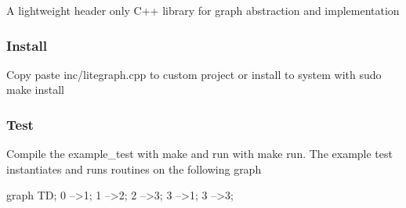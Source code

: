 A lightweight header only C++ library for graph abstraction and implementation

\subsubsection*{Install}

Copy paste {\ttfamily inc/litegraph.\+cpp} to custom project or install to system with {\ttfamily sudo make install}

\subsubsection*{Test}

Compile the {\ttfamily example\+\_\+test} with {\ttfamily make} and run with {\ttfamily make run}. The example test instantiates and runs routines on the following graph


\begin{DoxyCode}
graph TD;
0 -->1;
1 -->2;
2 -->3;
3 -->1;
3 -->3;
\end{DoxyCode}
 